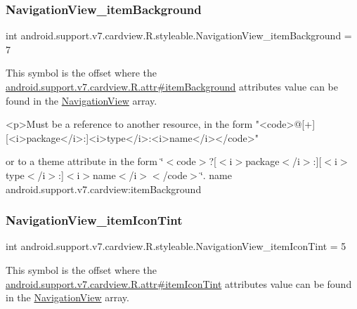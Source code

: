 \subsubsection{\texorpdfstring{Navigation\+View\+\_\+item\+Background}{NavigationView\_itemBackground}}
{\footnotesize\ttfamily int android.\+support.\+v7.\+cardview.\+R.\+styleable.\+Navigation\+View\+\_\+item\+Background = 7\hspace{0.3cm}{\ttfamily [static]}}

This symbol is the offset where the \hyperlink{classandroid_1_1support_1_1v7_1_1cardview_1_1R_1_1attr_ad7f63c9a2a7d13b6e12c2e94acd31e05}{android.\+support.\+v7.\+cardview.\+R.\+attr\#item\+Background} attribute\textquotesingle{}s value can be found in the \hyperlink{classandroid_1_1support_1_1v7_1_1cardview_1_1R_1_1styleable_aab4216e563b2e19093e1d57494734202}{Navigation\+View} array.

\begin{DoxyVerb}      <p>Must be a reference to another resource, in the form "<code>@[+][<i>package</i>:]<i>type</i>:<i>name</i></code>"
\end{DoxyVerb}
 or to a theme attribute in the form \char`\"{}$<$code$>$?\mbox{[}$<$i$>$package$<$/i$>$\+:\mbox{]}\mbox{[}$<$i$>$type$<$/i$>$\+:\mbox{]}$<$i$>$name$<$/i$>$$<$/code$>$\char`\"{}.  name android.\+support.\+v7.\+cardview\+:item\+Background \mbox{\label{classandroid_1_1support_1_1v7_1_1cardview_1_1R_1_1styleable_a2ab0ca375d97bd7ddedbe29e6eee2165}} 
\subsubsection{\texorpdfstring{Navigation\+View\+\_\+item\+Icon\+Tint}{NavigationView\_itemIconTint}}
{\footnotesize\ttfamily int android.\+support.\+v7.\+cardview.\+R.\+styleable.\+Navigation\+View\+\_\+item\+Icon\+Tint = 5\hspace{0.3cm}{\ttfamily [static]}}

This symbol is the offset where the \hyperlink{classandroid_1_1support_1_1v7_1_1cardview_1_1R_1_1attr_a1a956cf2559faa64461061b13883f806}{android.\+support.\+v7.\+cardview.\+R.\+attr\#item\+Icon\+Tint} attribute\textquotesingle{}s value can be found in the \hyperlink{classandroid_1_1support_1_1v7_1_1cardview_1_1R_1_1styleable_aab4216e563b2e19093e1d57494734202}{Navigation\+View} array.

